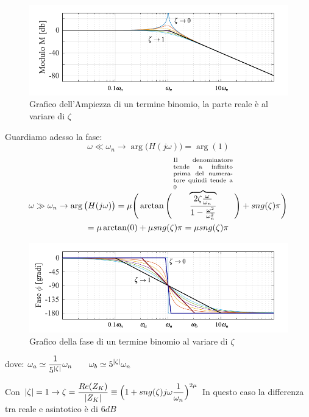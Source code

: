 \begin{figure}[H]
	\centering
	\includegraphics[width=0.7\linewidth]{immagini/cap6_Bode/bodeBin-Amp}
	\caption{Grafico dell'Ampiezza di un termine binomio, la parte reale è al variare di $ \zeta $}
	\label{fig:bodeBin-Amp}
\end{figure}

Guardiamo adesso la fase:
\begin{equation*}
	\omega \ll \omega_n \rightarrow \arg \big(H(j\omega)\big) = \arg(1)
\end{equation*}
\begin{multline*}
	\omega \gg \omega_n \rightarrow \arg \big(H(j\omega)\big) = \mu \Bigg(\arctan\Bigg(\overbrace{\frac{2\zeta\frac{\omega}{\omega_n}}{1-\frac{\omega^2}{\omega^{2}_{n}}}}^{\parbox{7
			em}{\scriptsize Il denominatore tende a infinito prima del numeratore quindi tende a 0}}\Bigg)+ \sng(\zeta)\pi\Bigg) \\= \mu \arctan(0) + \mu \sng(\zeta)\pi = \mu \sng(\zeta)\pi
\end{multline*}

\begin{figure}[H]
	\centering
	\includegraphics[width=0.7\linewidth]{immagini/cap6_Bode/bodeBin-Fas}
	\caption{Grafico della fase di un termine binomio al variare di $ \zeta $}
	\label{fig:bodeBin-Fas}
\end{figure}
dove: $\displaystyle \omega_a \simeq \frac{1}{5^{\lvert\zeta\rvert}}\omega_n \qquad \omega_b \simeq 5^{\lvert\zeta\rvert}\omega_n$


	Con $\displaystyle \lvert\zeta\rvert=1 \rightarrow \zeta =\frac{Re (Z_K)}{\lvert Z_K\rvert} \equiv \Big(1+sng(\zeta)j \omega \frac{1}{\omega_n}\Big)^{2\mu} $  In questo caso la differenza tra reale e asintotico è di $ 6 dB $
	
